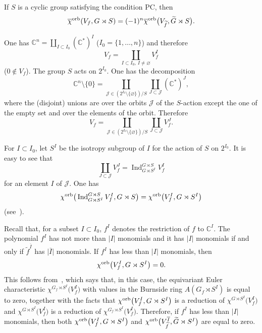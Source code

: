 \begin{Theorem}\label{theo:Main} If $S$ is a cyclic group satisfying the condition PC, then
 \begin{gather}\label{eqn:Main}
 {\overline{\chi}}^{ \rm orb}(V_f,G \rtimes S)=(-1)^n {\overline{\chi}}^{ \rm orb}\big(V_{\widetilde{f}},\widetilde{G} \rtimes S\big) .
 \end{gather}
\end{Theorem}

One has ${\mathbb C}^n=\coprod_{I\subset I_0}({\mathbb C}^*)^I$ ($I_0=\{1,\dots, n\}$) and therefore
\[V_f=\coprod_{I\subset I_0,\, I\ne\varnothing} V_f^I
\]
($0\notin V_f$). The group $S$ acts on
$2^{I_0}$. One has the decomposition
\[
{\mathbb C}^n \setminus \{ 0 \} =\coprod_{{\mathcal J}\in\left(2^{I_0}\setminus\{\varnothing\}\right)/S}\coprod_{J\subset {\mathcal J}}({\mathbb C}^*)^J,
\]
where the (disjoint)
unions are over the orbits ${\mathcal J}$ of the $S$-action except the one of the empty set and over the elements of
the orbit. Therefore
\[
V_f=\coprod_{{\mathcal J}\in\left(2^{I_0}\setminus\{\varnothing\}\right)/S}\coprod_{J\subset {\mathcal J}}V_f^J.
\]

For $I\subset I_0$, let $S^I$ be the isotropy subgroup of $I$ for the action of $S$ on $2^{I_0}$. It is easy to see that
\[
\coprod_{J\subset {\mathcal J}}V_f^J=\operatorname{Ind}_{G\rtimes S^I}^{G\rtimes S} V_f^I
\]
for an element $I$ of ${\mathcal J}$. One has
\[
{\chi}^{\rm orb}\big(\operatorname{Ind}_{G\rtimes S^I}^{G\rtimes S} V_f^I, G\rtimes S\big)=
{\chi}^{\rm orb}\big(V_f^I, G\rtimes S^I\big)
\]
(see~\cite[Theorem~1]{GLM}).

Recall that, for a subset $I\subset I_0$, $f^I$ denotes the restriction of $f$ to ${\mathbb C}^I$. The polynomial $f^I$ has
not more than $\vert I\vert$ monomials and it has $\vert I\vert$ monomials if and only if
$\widetilde{f}^{\overline{I}}$ has $\vert \overline{I}\vert$ monomials. If $f^I$ has less than $\vert I\vert$
monomials, then
\[
{\chi}^{\rm orb}\big(V_f^I, G\rtimes S^I\big)=0 .
\]
This follows from~\cite[Lemma~1]{EG-IMRN}, which says that, in this case, the equivariant Euler characteristic $\chi^{G_f\rtimes S^I}\big(V_f^I\big)$ with values in the Burnside ring $A(G_f\rtimes S^I)$ is equal to zero, together with the facts that ${\chi}^{\rm orb}\big(V_f^I, G\rtimes S^I\big)$ is a reduction of $\chi^{G\rtimes S^I}\big(V_f^I\big)$ and $\chi^{G\rtimes S^I}\big(V_f^I\big)$ is a reduction of $\chi^{G_f\rtimes S^I}\big(V_f^I\big)$. Therefore, if $f^I$ has less than $\vert I\vert$ monomials, then both ${\chi}^{\rm orb}\big(V_f^I, G\rtimes S^I\big)$ and ${\chi}^{\rm orb}\big(V_{\widetilde{f}}^{\overline{I}}, \widetilde{G}\rtimes S^I\big)$ are equal to zero.

